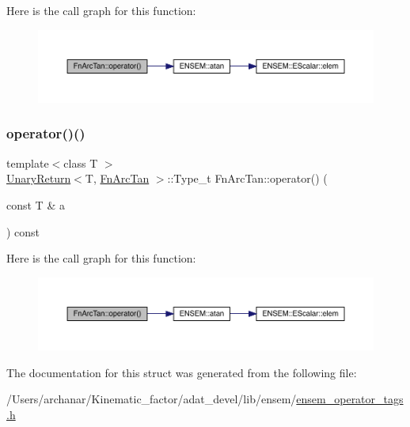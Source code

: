 Here is the call graph for this function\+:
\nopagebreak
\begin{figure}[H]
\begin{center}
\leavevmode
\includegraphics[width=350pt]{df/dc4/structFnArcTan_a7e6a58ff73a64fb87d8a8a232050a225_cgraph}
\end{center}
\end{figure}
\mbox{\label{structFnArcTan_a7e6a58ff73a64fb87d8a8a232050a225}} 
\subsubsection{\texorpdfstring{operator()()}{operator()()}\hspace{0.1cm}{\footnotesize\ttfamily [2/2]}}
{\footnotesize\ttfamily template$<$class T $>$ \\
\mbox{\hyperlink{structUnaryReturn}{Unary\+Return}}$<$T, \mbox{\hyperlink{structFnArcTan}{Fn\+Arc\+Tan}} $>$\+::Type\+\_\+t Fn\+Arc\+Tan\+::operator() (\begin{DoxyParamCaption}\item[{const T \&}]{a }\end{DoxyParamCaption}) const\hspace{0.3cm}{\ttfamily [inline]}}

Here is the call graph for this function\+:
\nopagebreak
\begin{figure}[H]
\begin{center}
\leavevmode
\includegraphics[width=350pt]{df/dc4/structFnArcTan_a7e6a58ff73a64fb87d8a8a232050a225_cgraph}
\end{center}
\end{figure}


The documentation for this struct was generated from the following file\+:\begin{DoxyCompactItemize}
\item 
/\+Users/archanar/\+Kinematic\+\_\+factor/adat\+\_\+devel/lib/ensem/\mbox{\hyperlink{lib_2ensem_2ensem__operator__tags_8h}{ensem\+\_\+operator\+\_\+tags.\+h}}\end{DoxyCompactItemize}

